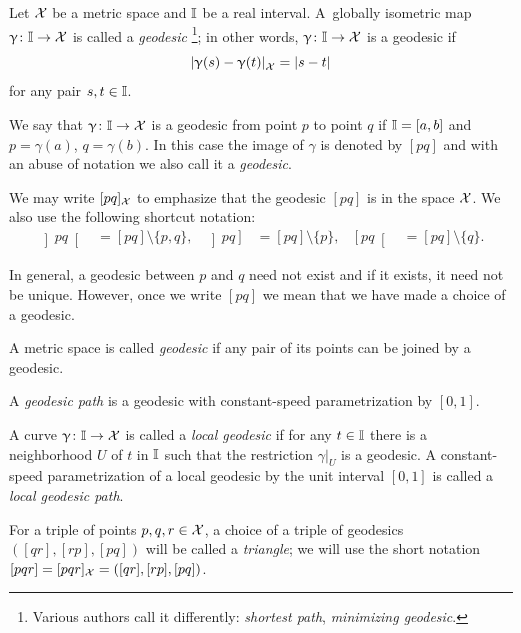 Let $\mathcal{X}$ be a metric space 
and $\mathbb{I}$ be a real interval.
A~globally isometric map $\gamma\:\II\z\to \spc{X}$ is called a \emph{geodesic}%
\footnote{Various authors call it differently: {}\emph{shortest path}, {}\emph{minimizing geodesic}.}; 
in other words, $\gamma\:\II\z\to \spc{X}$ is a geodesic if
\[\dist{\gamma(s)}{\gamma(t)}{\spc{X}}=|s-t|\]
for any pair $s,t\in \II$.

We say that  $\gamma\:\II\to \spc{X}$ is a geodesic from point $p$ to point $q$ if 
$\mathbb{I}=[a,b]$ and $p=\gamma(a)$, $q=\gamma(b)$.
In this case the image of $\gamma$ is denoted by $[p q]$ and with an abuse of notation  we also call it a \emph{geodesic}.

We may write $[p q]_{\mathcal{X}}$ 
to emphasize that the geodesic $[p q]$ is in the space  ${\mathcal{X}}$.
We also use the following shortcut notation:
\begin{align*}
\left] p q \right[&=[pq]\setminus\{p,q\},
&
\left] p q \right]&=[pq]\setminus\{p\},
&
\left[ p q \right[&=[pq]\setminus\{q\}.
\end{align*}



In general, a geodesic between $p$ and $q$ need not exist and if it exists, it need not  be unique.  
However,  once we write $[p q]$ we mean that we have  made a choice of  a geodesic.

A metric space is called \emph{geodesic} if any pair of its points can be joined by a geodesic. 


A \emph{geodesic path} is a geodesic with constant-speed parametrization by $[0,1]$.

A curve $\gamma\:\II\to \spc{X}$  is called a \emph{local geodesic} if for any $t\in\II$ there is a neighborhood $U$ of $t$ in $\mathbb{I}$ such that the restriction $\gamma|_U$ is a  geodesic.
A constant-speed parametrization of a local geodesic by the unit interval $[0,1]$ is called a \emph{local geodesic path}. 


For a triple of points $p,q,r\in \spc{X}$, a choice of a triple of geodesics $([q r], [r p], [p q])$ will be called a \emph{triangle}; we will use the short notation 
$[pqr]=[pqr]_{\mathcal{X}}=([q r], [r p], [p q])$.


